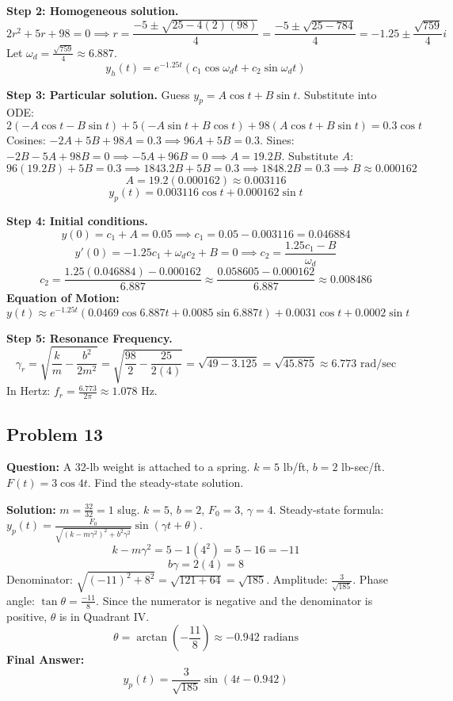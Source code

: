 \documentclass[11pt]{article}
\begin{document}
\textbf{Step 2: Homogeneous solution.}
\[ 2r^2 + 5r + 98 = 0 \implies r = \frac{-5 \pm \sqrt{25 - 4(2)(98)}}{4} = \frac{-5 \pm \sqrt{25 - 784}}{4} = -1.25 \pm \frac{\sqrt{759}}{4}i \]
Let $\omega_d = \frac{\sqrt{759}}{4} \approx 6.887$.
\[ y_h(t) = e^{-1.25t}(c_1 \cos \omega_d t + c_2 \sin \omega_d t) \]

\textbf{Step 3: Particular solution.}
Guess $y_p = A \cos t + B \sin t$.
Substitute into ODE:
\[ 2(-A \cos t - B \sin t) + 5(-A \sin t + B \cos t) + 98(A \cos t + B \sin t) = 0.3 \cos t \]
Cosines: $-2A + 5B + 98A = 0.3 \implies 96A + 5B = 0.3$.
Sines: $-2B - 5A + 98B = 0 \implies -5A + 96B = 0 \implies A = 19.2B$.
Substitute $A$:
\[ 96(19.2B) + 5B = 0.3 \implies 1843.2B + 5B = 0.3 \implies 1848.2B = 0.3 \implies B \approx 0.000162 \]
\[ A = 19.2(0.000162) \approx 0.003116 \]
\[ y_p(t) = 0.003116 \cos t + 0.000162 \sin t \]

\textbf{Step 4: Initial conditions.}
\[ y(0) = c_1 + A = 0.05 \implies c_1 = 0.05 - 0.003116 = 0.046884 \]
\[ y'(0) = -1.25c_1 + \omega_d c_2 + B = 0 \implies c_2 = \frac{1.25c_1 - B}{\omega_d} \]
\[ c_2 = \frac{1.25(0.046884) - 0.000162}{6.887} \approx \frac{0.058605 - 0.000162}{6.887} \approx 0.008486 \]
\textbf{Equation of Motion:}
\[ y(t) \approx e^{-1.25t}(0.0469 \cos 6.887t + 0.0085 \sin 6.887t) + 0.0031 \cos t + 0.0002 \sin t \]

\textbf{Step 5: Resonance Frequency.}
\[ \gamma_r = \sqrt{\frac{k}{m} - \frac{b^2}{2m^2}} = \sqrt{\frac{98}{2} - \frac{25}{2(4)}} = \sqrt{49 - 3.125} = \sqrt{45.875} \approx 6.773 \text{ rad/sec} \]
In Hertz: $f_r = \frac{6.773}{2\pi} \approx 1.078$ Hz.

\subsection{Problem 13}
\textbf{Question:} A 32-lb weight is attached to a spring. $k = 5$ lb/ft, $b = 2$ lb-sec/ft. $F(t) = 3 \cos 4t$. Find the steady-state solution.

\textbf{Solution:}
$m = \frac{32}{32} = 1$ slug. $k = 5$, $b = 2$, $F_0 = 3$, $\gamma = 4$.
Steady-state formula: $y_p(t) = \frac{F_0}{\sqrt{(k-m\gamma^2)^2 + b^2\gamma^2}} \sin(\gamma t + \theta)$.
\[ k - m\gamma^2 = 5 - 1(4^2) = 5 - 16 = -11 \]
\[ b\gamma = 2(4) = 8 \]
Denominator: $\sqrt{(-11)^2 + 8^2} = \sqrt{121 + 64} = \sqrt{185}$.
Amplitude: $\frac{3}{\sqrt{185}}$.
Phase angle: $\tan \theta = \frac{-11}{8}$.
Since the numerator is negative and the denominator is positive, $\theta$ is in Quadrant IV.
\[ \theta = \arctan\left(-\frac{11}{8}\right) \approx -0.942 \text{ radians} \]
\textbf{Final Answer:}
\[ y_p(t) = \frac{3}{\sqrt{185}} \sin(4t - 0.942) \]
\end{document}
